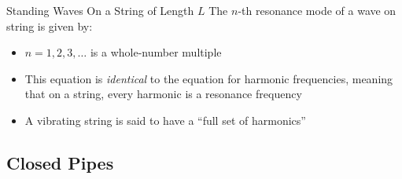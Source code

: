 \documentclass[12pt,compress,aspectratio=169]{beamer}
\begin{document}
\begin{frame}{Standing Waves On a String of Length $L$}
  The $n$-th resonance mode of a wave on string is given by:

  \begin{itemize}
  \item $n=1,2,3,\ldots$ is a whole-number multiple
  \item This equation is \emph{identical} to the equation for harmonic
    frequencies, meaning that on a string, every harmonic is a resonance
    frequency
  \item A vibrating string is said to have a ``full set of harmonics''
  \end{itemize}
\end{frame}


\subsection{Closed Pipes}
\end{document}

